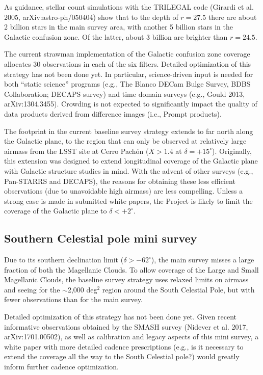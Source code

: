 \documentclass[DM,lsstdraft,toc,usenatbib]{lsstdoc}
\begin{document}
As guidance, stellar count simulations with the TRILEGAL code (Girardi et al. 2005, 
arXiv:astro-ph/050404) show that to the depth of $r=27.5$ there are about 2 billion
stars in the main survey area, with another 5 billion stars in the Galactic confusion 
zone. Of the latter, about 3 billion are brighter than $r=24.5$.  

The current strawman implementation of the Galactic confusion zone coverage allocates 
30 observations in each of the six filters. Detailed optimization of this strategy has not 
been done yet. In particular, science-driven input is needed for both ``static science''
programs (e.g., The Blanco DECam Bulge Survey, BDBS Collaboration; DECAPS survey) 
and  time domain surveys (e.g., Gould 2013, arXiv:1304.3455). Crowding is not expected to 
significantly impact the quality of data products derived from difference images (i.e., Prompt 
products).

The footprint in the current baseline survey strategy extends to far north along the Galactic
plane, to the region that can only be observed at relatively large airmass from the LSST
site at Cerro Pach\'on ($X>1.4$ at $\delta  = +15^\circ$). Originally, this extension was designed 
to extend longitudinal coverage of the Galactic plane with Galactic structure studies in mind. 
With the advent of other surveys (e.g., Pan-STARRS and DECAPS), the reasons for obtaining 
these less efficient observations (due to unavoidable high airmass) are less compelling. 
Unless a strong case is made in submitted white papers, the Project is likely to limit the 
coverage of the Galactic plane to $\delta < +2^\circ$. 


\subsection{Southern Celestial pole mini survey}

Due to its southern declination limit ($\delta > -62^\circ$), the main survey misses a large fraction
of both the Magellanic Clouds. To allow coverage of the Large and Small Magellanic Clouds, the 
baseline survey strategy uses relaxed limits on airmass and seeing for the $\sim$2,000 deg$^2$ region 
around the South Celestial Pole, but with fewer observations than for the main survey. 

Detailed optimization of this strategy has not been done yet. Given recent informative observations 
obtained by the SMASH survey (Nidever et al. 2017, arXiv:1701.00502), as well as calibration 
and legacy aspects of this mini survey, a white paper with more detailed cadence prescriptions
(e.g., is it necessary to extend the coverage all the way to the South Celestial pole?) would greatly 
inform further cadence optimization. 
\end{document}
